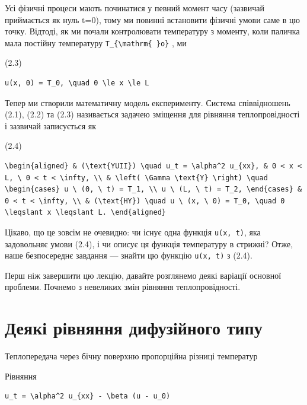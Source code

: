 \documentclass[
  ukrainian,
]{article}
\begin{document}
Усі фізичні процеси мають починатися у певний момент часу (зазвичай
приймається як нуль t=0), тому ми повинні встановити фізичні умови саме
в цю точку. Відтоді, як ми почали контролювати температуру з моменту,
коли паличка мала постійну температуру
\texttt{T\_\{\textbackslash{}mathrm\{\ \}o\}} , ми

(2.3)

\begin{verbatim}
u(x, 0) = T_0, \quad 0 \le x \le L
\end{verbatim}

Тепер ми створили математичну модель експерименту. Система співвідношень
(2.1), (2.2) та (2.3) називається задачею зміщення для рівняння
теплопровідності і зазвичай записується як

(2.4)

\begin{verbatim}
\begin{aligned} & (\text{YUII}) \quad u_t = \alpha^2 u_{xx}, & 0 < x < L, \ 0 < t < \infty, \\ & \left( \Gamma \text{Y} \right) \quad \begin{cases} u \ (0, \ t) = T_1, \\ u \ (L, \ t) = T_2, \end{cases} & 0 < t < \infty, \\ & (\text{HY}) \quad u \ (x, \ 0) = T_0, \quad 0 \leqslant x \leqslant L. \end{aligned}
\end{verbatim}

Цікаво, що це зовсім не очевидно: чи існує одна функція
\texttt{u(x,\ t)}, яка задовольняє умови (2.4), і чи описує ця функція
температуру в стрижні? Отже, наше безпосереднє завдання --- знайти цю
функцію \texttt{u(x,\ t)} з (2.4).

Перш ніж завершити цю лекцію, давайте розглянемо деякі варіації основної
проблеми. Почнемо з невеликих змін рівняння теплопровідності.

\section{Деякі рівняння дифузійного
типу}\label{ux434ux435ux44fux43aux456-ux440ux456ux432ux43dux44fux43dux43dux44f-ux434ux438ux444ux443ux437ux456ux439ux43dux43eux433ux43e-ux442ux438ux43fux443}

Теплопередача через бічну поверхню пропорційна різниці температур

Рівняння

\begin{verbatim}
u_t = \alpha^2 u_{xx} - \beta (u - u_0)
\end{verbatim}
\end{document}

